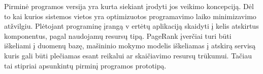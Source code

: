 Pirminė programos versija yra kurta siekiant įrodyti jos veikimo koncepciją. Dėl to kai kurios sistemos vietos yra optimizuotos programavimo laiko minimizavimo atžvilgiu. Plėtojant programinę įrangą v ertėtų aplikaciją skaidyti į kelis atskirtus komponentus, pagal naudojamų resursų tipą. PageRank įverčiai turi būti iškeliami į duomenų bazę, mašininio mokymo modelis iškeliamas į atskirą servisą kuris gali būti plečiamas esant reikalui ar skaičiavimo resursų trūkumui. Tačiau tai stipriai apsunkintų pirminį programos prototipą.